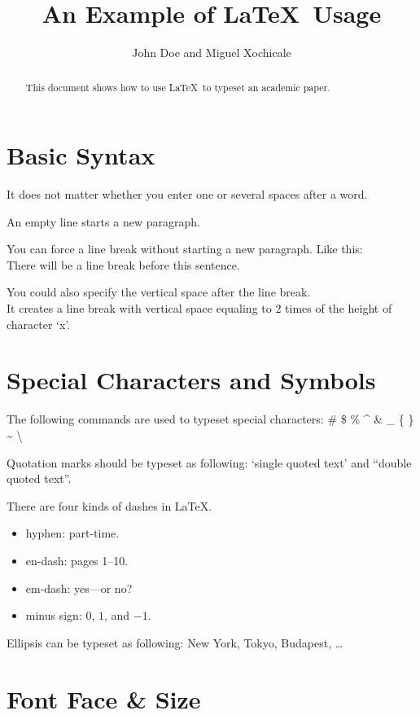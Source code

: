 \documentclass[conference]{IEEEtran}
\title{An Example of \LaTeX~Usage}
\author{John Doe and Miguel Xochicale}
\begin{document}
\maketitle

\begin{abstract}
  This document shows how to use \LaTeX~to typeset an academic paper.
\end{abstract}

\section{Basic Syntax}

It does not matter whether
you enter one or several
spaces        after a word.

An empty line starts a new
paragraph.

You can force a line break without starting a new paragraph. Like this: \\
There will be a line break before this sentence.

You could also specify the vertical space after the line break. \\ [2ex]
It creates a line break with vertical space equaling to 2 times of the height of character `x'.

\section{Special Characters and Symbols}

The following commands are used to typeset special characters:
\# \$ \% \^{} \& \_ \{ \} \~{} \textbackslash

Quotation marks should be typeset as following: `single quoted text' and ``double quoted text''.

There are four kinds of dashes in \LaTeX{}.
\begin{itemize}
  \item hyphen: part-time.
  \item en-dash: pages 1--10.
  \item em-dash: yes---or no?
  \item minus sign: $0$, $1$, and $-1$.
\end{itemize}

Ellipsis can be typeset as following: New York, Tokyo, Budapest, \ldots

\section{Font Face \& Size}
\end{document}
